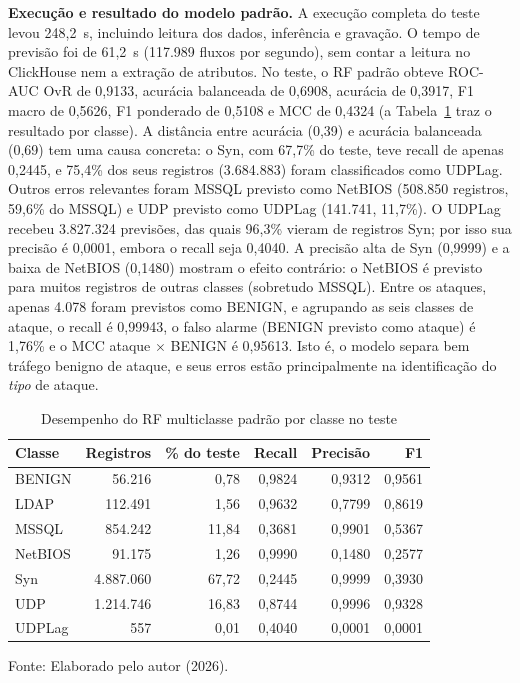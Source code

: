 \documentclass[
    12pt,                %
    openright,           %
    oneside,             %
    a4paper,             %
    english,             %
    brazil               %
]{abntex2}
\begin{document}
\textbf{Execução e resultado do modelo padrão.} A execução completa do teste levou 248,2~s, incluindo leitura dos dados, inferência e gravação. O tempo de previsão foi de 61,2~s (117.989 fluxos por segundo), sem contar a leitura no ClickHouse nem a extração de atributos. No teste, o RF padrão obteve ROC-AUC OvR de 0,9133, acurácia balanceada de 0,6908, acurácia de 0,3917, F1 macro de 0,5626, F1 ponderado de 0,5108 e MCC de 0,4324 (a Tabela~\ref{tab:rf-multi-teste-classe} traz o resultado por classe). A distância entre acurácia (0,39) e acurácia balanceada (0,69) tem uma causa concreta: o Syn, com 67,7\% do teste, teve recall de apenas 0,2445, e 75,4\% dos seus registros (3.684.883) foram classificados como UDPLag. Outros erros relevantes foram MSSQL previsto como NetBIOS (508.850 registros, 59,6\% do MSSQL) e UDP previsto como UDPLag (141.741, 11,7\%). O UDPLag recebeu 3.827.324 previsões, das quais 96,3\% vieram de registros Syn; por isso sua precisão é 0,0001, embora o recall seja 0,4040. A precisão alta de Syn (0,9999) e a baixa de NetBIOS (0,1480) mostram o efeito contrário: o NetBIOS é previsto para muitos registros de outras classes (sobretudo MSSQL). Entre os ataques, apenas 4.078 foram previstos como BENIGN, e agrupando as seis classes de ataque, o recall é 0,99943, o falso alarme (BENIGN previsto como ataque) é 1,76\% e o MCC ataque $\times$ BENIGN é 0,95613. Isto é, o modelo separa bem tráfego benigno de ataque, e seus erros estão principalmente na identificação do \textit{tipo} de ataque.
 
\begin{table}
\centering
\caption{Desempenho do RF multiclasse padrão por classe no teste}
\label{tab:rf-multi-teste-classe}
\begin{tabular}{lrrrrr}
\hline
Classe & Registros & \% do teste & Recall & Precisão & F1 \\
\hline
BENIGN  & 56.216    & 0,78  & 0,9824 & 0,9312 & 0,9561 \\
LDAP    & 112.491   & 1,56  & 0,9632 & 0,7799 & 0,8619 \\
MSSQL   & 854.242   & 11,84 & 0,3681 & 0,9901 & 0,5367 \\
NetBIOS & 91.175    & 1,26  & 0,9990 & 0,1480 & 0,2577 \\
Syn     & 4.887.060 & 67,72 & 0,2445 & 0,9999 & 0,3930 \\
UDP     & 1.214.746 & 16,83 & 0,8744 & 0,9996 & 0,9328 \\
UDPLag  & 557       & 0,01  & 0,4040 & 0,0001 & 0,0001 \\
\hline
\end{tabular}
\par\smallskip
Fonte: Elaborado pelo autor (2026).
\end{table}
 
\end{document}
